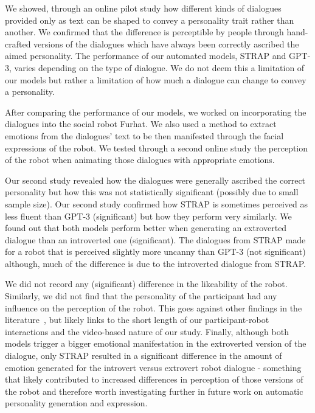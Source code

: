 \documentclass[nomenclature, english, biblatex]{kththesis}
\begin{document}
We showed, through an online pilot study how different kinds of dialogues provided only as text can be shaped to convey a personality trait rather than another. We confirmed that the difference is perceptible by people through hand-crafted versions of the dialogues which have always been correctly ascribed the aimed personality. The performance of our automated models, STRAP and GPT-3, varies depending on the type of dialogue. We do not deem this a limitation of our models but rather a limitation of how much a dialogue can change to convey a personality.

After comparing the performance of our models, we worked on incorporating the dialogues into the social robot Furhat. We also used a method to extract emotions from the dialogues' text to be then manifested through the facial expressions of the robot. We tested through a second online study the perception of the robot when animating those dialogues with appropriate emotions.

Our second study revealed how the dialogues were generally ascribed the correct personality but how this was not statistically significant (possibly due to small sample size). Our second study confirmed how STRAP is sometimes perceived as less fluent than GPT-3 (significant) but how they perform very similarly. We found out that both models perform better when generating an extroverted dialogue than an introverted one (significant). The dialogues from STRAP made for a robot that is perceived slightly more uncanny than GPT-3 (not significant) although, much of the difference is due to the introverted dialogue from STRAP.

We did not record any (significant) difference in the likeability of the robot. Similarly, we did not find that the personality of the participant had any influence on the perception of the robot. This goes against other findings in the literature~\cite{andrist2015look, esterwood2021birds, andriella2020have}, but likely links to the short length of our participant-robot interactions and the video-based nature of our study. Finally, although both models trigger a bigger emotional manifestation in the extroverted version of the dialogue, only STRAP resulted in a significant difference in the amount of emotion generated for the introvert versus extrovert robot dialogue - something that likely contributed to increased differences in perception of those versions of the robot and therefore worth investigating further in future work on automatic personality generation and expression. 
\end{document}
